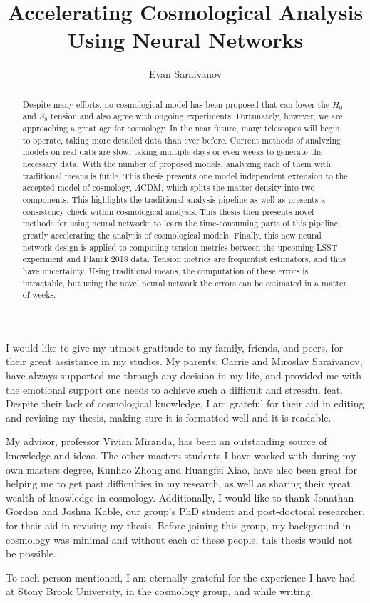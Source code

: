 \documentclass[master,bottom,nosig]{usbthesis}
\author{Evan Saraivanov}%
\title{Accelerating Cosmological Analysis Using Neural Networks}%
\theoremstyle{definition}
\theoremstyle{plain} %
\begin{document}
\singlespacing %
\maketitle %
\makeapproval %

\begin{abstract}
Despite many efforts, no cosmological model has been proposed that can lower the $H_0$ and $S_8$ tension and also agree with ongoing experiments. Fortunately, however, we are approaching a great age for cosmology. In the near future, many telescopes will begin to operate, taking more detailed data than ever before. Current methods of analyzing models on real data are slow, taking multiple days or even weeks to generate the necessary data. With the number of proposed models, analyzing each of them with traditional means is futile. This thesis presents one model independent extension to the accepted model of cosmology, $\Lambda$CDM, which splits the matter density into two components. This highlights the traditional analysis pipeline as well as presents a consistency check within cosmological analysis. This thesis then presents novel methods for using neural networks to learn the time-consuming parts of this pipeline, greatly accelerating the analysis of cosmological models. Finally, this new neural network design is applied to computing tension metrics between the upcoming LSST experiment and Planck 2018 data. Tension metrics are frequentist estimators, and thus have uncertainty. Using traditional means, the computation of these errors is intractable, but using the novel neural network the errors can be estimated in a matter of weeks.
\end{abstract}
\tableofcontents %
\listoffigures %
%
%
\begin{acknowledgements}
I would like to give my utmost gratitude to my family, friends, and peers, for their great assistance in my studies. My parents, Carrie and Miroslav Saraivanov, have always supported me through any decision in my life, and provided me with the emotional support one needs to achieve such a difficult and stressful feat. Despite their lack of cosmological knowledge, I am grateful for their aid in editing and revising my thesis, making sure it is formatted well and it is readable. 

My advisor, professor Vivian Miranda, has been an outstanding source of knowledge and ideas. The other masters students I have worked with during my own masters degree, Kunhao Zhong and Huangfei Xiao, have also been great for helping me to get past difficulties in my research, as well as sharing their great wealth of knowledge in cosmology. Additionally, I would like to thank Jonathan Gordon and Joshua Kable, our group's PhD student and post-doctoral researcher, for their aid in revising my thesis. Before joining this group, my background in cosmology was minimal and without each of these people, this thesis would not be possible.

To each person mentioned, I am eternally grateful for the experience I have had at Stony Brook University, in the cosmology group, and while writing.
\end{acknowledgements}
\pagestyle{thesis}
\newpage
{}
\end{document}
